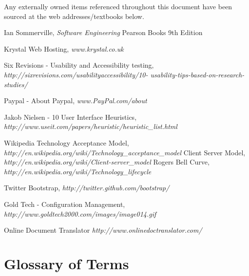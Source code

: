\documentclass{l3proj}
\begin{document}
\appendix
Any externally owned items referenced throughout this document have been sourced
at the web addresses/textbooks below.
\begin{thebibliography}{9}

  Ian Sommerville,
  \emph{Software Engineering}
  Pearson Books
  9th Edition

  Krystal Web Hosting,
  \emph{www.krystal.co.uk}

  Six Revisions - Usability and Accessibility testing,
  \emph{http://sixrevisions.com/usabilityaccessibility/10-
usability-tips-based-on-research-studies/}

  Paypal - About Paypal,
  \emph{www.PayPal.com/about}

  Jakob Nielsen - 10 User Interface Heuristics,
  \emph{http://www.useit.com/papers/heuristic/heuristic\_list.html}


  Wikipedia
  Technology Acceptance Model,
  \emph{http://en.wikipedia.org/wiki/Technology\_acceptance\_model}
  Client Server Model,
  \emph{http://en.wikipedia.org/wiki/Client-server\_model}
  Rogers Bell Curve,
  \emph{http://en.wikipedia.org/wiki/Technology\_lifecycle}
  
  Twitter Bootstrap,
  \emph{http://twitter.github.com/bootstrap/}

  Gold Tech - Configuration Management,
  \emph{http://www.goldtech2000.com/images/image014.gif}

  Online Document Translator
  \emph{http://www.onlinedoctranslator.com/}
   
\end{thebibliography}


\chapter{Glossary of Terms}
\label{chap:gloss}
\end{document}
